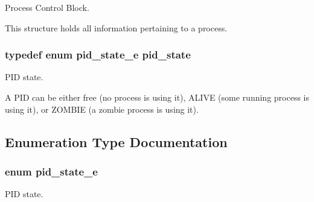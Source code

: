 Process Control Block. 

This structure holds all information pertaining to a process. 
\subsubsection[{\texorpdfstring{pid\+\_\+state}{pid_state}}]{\setlength{\rightskip}{0pt plus 5cm}typedef enum {\bf pid\+\_\+state\+\_\+e}  {\bf pid\+\_\+state}}\hypertarget{group__proc_gade1eea4d20492c4c97263201145e5097}{}\label{group__proc_gade1eea4d20492c4c97263201145e5097}


P\+ID state. 

A P\+ID can be either free (no process is using it), A\+L\+I\+VE (some running process is using it), or Z\+O\+M\+B\+IE (a zombie process is using it). 

\subsection{Enumeration Type Documentation}
\subsubsection[{\texorpdfstring{pid\+\_\+state\+\_\+e}{pid_state_e}}]{\setlength{\rightskip}{0pt plus 5cm}enum {\bf pid\+\_\+state\+\_\+e}}\hypertarget{group__proc_ga4f133ac5f9b2ca9c1446889baee1dc05}{}\label{group__proc_ga4f133ac5f9b2ca9c1446889baee1dc05}


P\+ID state. 

